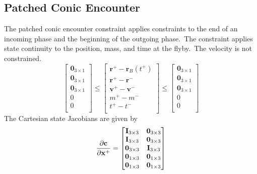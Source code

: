 \subsection{Patched Conic Encounter}
The patched conic encounter constraint applies constraints to the end of an incoming phase and the beginning of the outgoing phase.~The constraint applies state continuity to the position, mass, and time at the flyby.~The velocity is not constrained.
%
\begin{equation}
\begin{bmatrix}
   \mathbf{0}_{3 \times 1} \\
   \mathbf{0}_{3 \times 1} \\
   \mathbf{0}_{3 \times 1} \\
   0 \\
   0 \\
\end{bmatrix}
\leq
\begin{bmatrix}
   \mathbf{r}^{+} - \mathbf{r}_B(t^+) \\
   \mathbf{r}^{+} - \mathbf{r}^{-} \\
   \mathbf{v}^{+} - \mathbf{v}^{-} \\
   m^{+} - m^{-} \\
   t^{+} - t^{-} \\
\end{bmatrix}
\leq
\begin{bmatrix}
   \mathbf{0}_{3 \times 1} \\
   \mathbf{0}_{3 \times 1} \\
   \mathbf{0}_{3 \times 1} \\
   0 \\
   0 \\
\end{bmatrix}
\end{equation}
%
The Cartesian state Jacobians are given by
%
\begin{equation}
\frac{\partial \mathbf{c}}{\partial \mathbf{x}^+} =
\begin{bmatrix}
   \mathbf{I}_{3 \times 3}    & \mathbf{0}_{3 \times 3} \\
   \mathbf{I}_{3 \times 3}  & \mathbf{0}_{3 \times 3}  \\
    \mathbf{0}_{3 \times 3} & \mathbf{I}_{3 \times 3}   \\
   \mathbf{0}_{1 \times 3} &  \mathbf{0}_{1 \times 3} \\
   \mathbf{0}_{1 \times 3} &  \mathbf{0}_{1 \times 3} \\
\end{bmatrix}
\end{equation}
